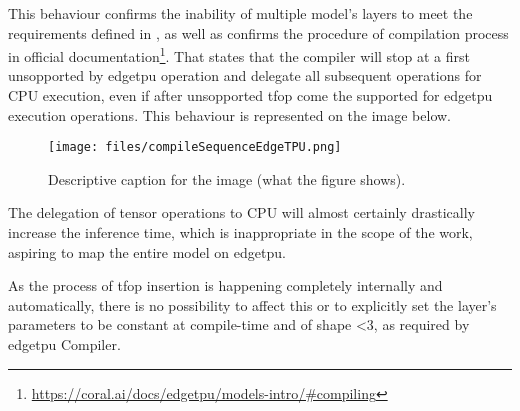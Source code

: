 {

This behaviour confirms the inability of multiple model's layers to meet the requirements defined in ,
as well as confirms the procedure of compilation process in official documentation\footnote{\url{https://coral.ai/docs/edgetpu/models-intro/\#compiling}}.
That states that the compiler will stop at a first unsopported by \gls{edgetpu} operation and delegate all subsequent operations for CPU execution,
even if after unsopported \gls{tfop} come the supported for \gls{edgetpu} execution operations. This behaviour is represented on the image below.

\begin{figure}[htbp]
  \centering
  \texttt{[image: files/compileSequenceEdgeTPU.png]}


  \caption{Descriptive caption for the image (what the figure shows).}
  \label{fig:compileSeqEdgeTPU}
\end{figure}

The delegation of tensor operations to CPU will almost certainly drastically increase the inference time,
which is inappropriate in the scope of the work, aspiring to map the entire model on \gls{edgetpu}.

As the process of  \gls{tfop} insertion is happening completely internally and automatically,
there is no possibility to affect this or to explicitly set the layer's parameters to be constant at compile-time and of shape <3, as required by \gls{edgetpu} Compiler.

}
